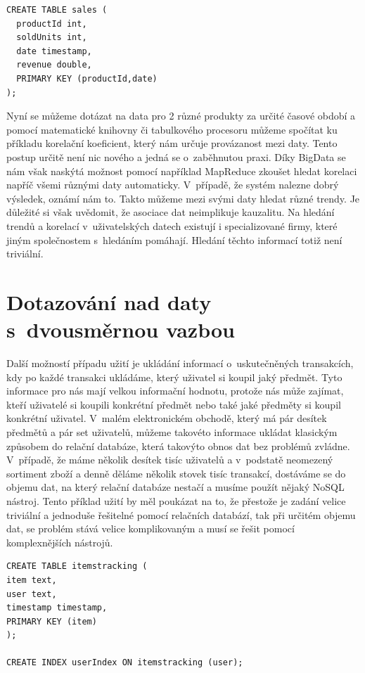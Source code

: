 \begin{lstlisting}[caption={Tabulka zisků z~prodeje předmětů v~daný den},label=corr1]
CREATE TABLE sales ( 
  productId int,
  soldUnits int,
  date timestamp,
  revenue double, 
  PRIMARY KEY (productId,date) 
);
\end{lstlisting}

Nyní se můžeme dotázat na data pro 2 různé produkty za určité časové období a pomocí matematické knihovny či tabulkového procesoru můžeme spočítat ku příkladu korelační koeficient, který nám určuje provázanost mezi daty. Tento postup určitě není nic nového a jedná se o~zaběhnutou praxi. Díky BigData se nám však naskýtá možnost pomocí například MapReduce zkoušet hledat korelaci napříč všemi různými daty automaticky. V~případě, že systém nalezne dobrý výsledek, oznámí nám to. Takto můžeme mezi svými daty hledat různé trendy. Je důležité si však uvědomit, že asociace dat neimplikuje kauzalitu. Na hledání trendů a korelací v~uživatelských datech existují i  specializované firmy, které jiným společnostem s~hledáním pomáhají. Hledání těchto informací totiž není triviální.

\section{Dotazování nad daty s~dvousměrnou vazbou}
Další možností případu užití je ukládání informací o~uskutečněných transakcích, kdy po každé transakci ukládáme, který uživatel si koupil jaký předmět. Tyto informace pro nás mají velkou informační hodnotu, protože nás může zajímat, kteří uživatelé si koupili konkrétní předmět nebo také jaké předměty si koupil konkrétní uživatel. V~malém elektronickém obchodě, který má pár desítek předmětů a pár set uživatelů, můžeme takovéto informace ukládat klasickým způsobem do relační databáze, která takovýto obnos dat bez problémů zvládne. V~případě, že máme několik desítek tisíc uživatelů a v~podstatě neomezený sortiment zboží a denně děláme několik stovek tisíc transakcí, dostáváme se do objemu dat, na který relační databáze nestačí a musíme použít nějaký NoSQL nástroj. Tento příklad užití by měl poukázat na to, že přestože je zadání velice triviální a jednoduše řešitelné pomocí relačních databází, tak při určitém objemu dat, se problém stává velice komplikovaným a musí se řešit pomocí komplexnějších nástrojů.

\begin{lstlisting}[caption={Vytvoření tabulky s~dvousměrnou vazbou pomocí indexu},label=CQL10]
CREATE TABLE itemstracking ( 
item text,
user text,
timestamp timestamp,
PRIMARY KEY (item)
);

CREATE INDEX userIndex ON itemstracking (user);
\end{lstlisting}

